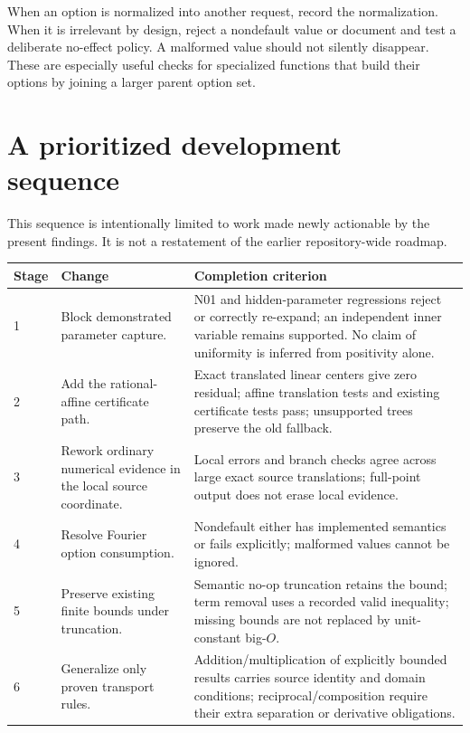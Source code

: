 \documentclass[11pt,a4paper]{article}
\newcommand{\code}[1]{\texttt{\detokenize{#1}}}
\begin{document}
When an option is normalized into another request, record the normalization. When it is irrelevant by design, reject a nondefault value or document and test a deliberate no-effect policy. A malformed value should not silently disappear. These are especially useful checks for specialized functions that build their options by joining a larger parent option set.

\section{A prioritized development sequence}\label{sec:roadmap}

This sequence is intentionally limited to work made newly actionable by the present findings. It is not a restatement of the earlier repository-wide roadmap.

\begin{longtable}{@{}L{15mm}L{55mm}L{87mm}@{}}
\toprule Stage & Change & Completion criterion\\\midrule{} & Block demonstrated parameter capture. & N01 and hidden-parameter regressions reject or correctly re-expand; an independent inner variable remains supported. No claim of uniformity is inferred from positivity alone.\\
2 & Add the rational-affine certificate path. & Exact translated linear centers give zero residual; affine translation tests and existing certificate tests pass; unsupported trees preserve the old fallback.\\
3 & Rework ordinary numerical evidence in the local source coordinate. & Local errors and branch checks agree across large exact source translations; full-point output does not erase local evidence.\\
4 & Resolve Fourier option consumption. & Nondefault \code{SeriesTermGoal} either has implemented semantics or fails explicitly; malformed values cannot be ignored.\\
5 & Preserve existing finite bounds under truncation. & Semantic no-op truncation retains the bound; term removal uses a recorded valid inequality; missing bounds are not replaced by unit-constant big-$O$.\\
6 & Generalize only proven transport rules. & Addition/multiplication of explicitly bounded results carries source identity and domain conditions; reciprocal/composition require their extra separation or derivative obligations.\\
\bottomrule
\end{longtable}
\end{document}
